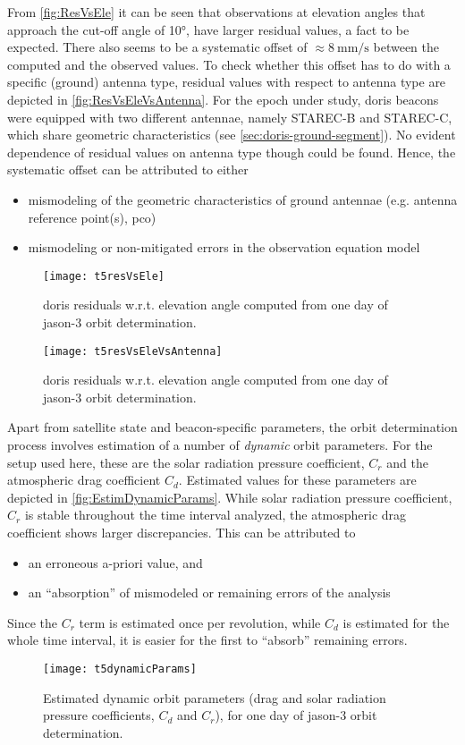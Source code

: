 From \autoref{fig:ResVsEle} it can be seen that observations at elevation angles that 
approach the cut-off angle of \ang{10}, have larger residual values, a fact to be expected. 
There also seems to be a systematic offset of $\approx \SI{8}{\milli\meter\per\second}$ 
between the computed and the observed values. To check whether this offset has to do 
with a specific (ground) antenna type, residual values with respect to antenna type 
are depicted in \autoref{fig:ResVsEleVsAntenna}. For the epoch under study, \gls{doris} 
beacons were equipped with two different antennae, namely STAREC-B and STAREC-C, which 
share geometric characteristics (see \autoref{sec:doris-ground-segment}). No evident 
dependence of residual values on antenna type though could be found. Hence, the 
systematic offset can be attributed to either
\begin{itemize}
  \item mismodeling of the geometric characteristics of ground antennae (e.g. antenna reference point(s), \gls{pco})
  \item mismodeling or non-mitigated errors in the observation equation model
\end{itemize}
\begin{figure}[ht]
    \centering
    \texttt{[image: t5resVsEle]}
    \caption{\gls{doris} residuals w.r.t. elevation angle computed from one day of \gls{jason}-3 orbit determination.}
    \label{fig:ResVsEle}
\end{figure}

\begin{figure}[ht]
    \centering
    \texttt{[image: t5resVsEleVsAntenna]}
    \caption{\gls{doris} residuals w.r.t. elevation angle computed from one day of \gls{jason}-3 orbit determination.}
    \label{fig:ResVsEleVsAntenna}
\end{figure}

Apart from satellite state and beacon-specific parameters, the orbit determination process 
involves estimation of a number of \emph{dynamic} orbit parameters. For the setup used here, 
these are the solar radiation pressure coefficient, $C_r$ and the atmospheric drag 
coefficient $C_d$. Estimated values for these parameters are depicted in 
\autoref{fig:EstimDynamicParams}. While solar radiation pressure coefficient, $C_r$ 
is stable throughout the time interval analyzed, the atmospheric drag coefficient 
shows larger discrepancies. This can be attributed to
\begin{itemize}
  \item an erroneous a-priori value, and
  \item an ``absorption'' of mismodeled or remaining errors of the analysis
\end{itemize}
Since the $C_r$ term is estimated once per revolution, while $C_d$ is estimated for the 
whole time interval, it is easier for the first to ``absorb'' remaining errors.
\begin{figure}[ht]
    \centering
    \texttt{[image: t5dynamicParams]}
    \caption{Estimated dynamic orbit parameters (drag and solar radiation pressure coefficients, $C_d$ and $C_r$), for one day of \gls{jason}-3 orbit determination.}
    \label{fig:EstimDynamicParams}
\end{figure}

